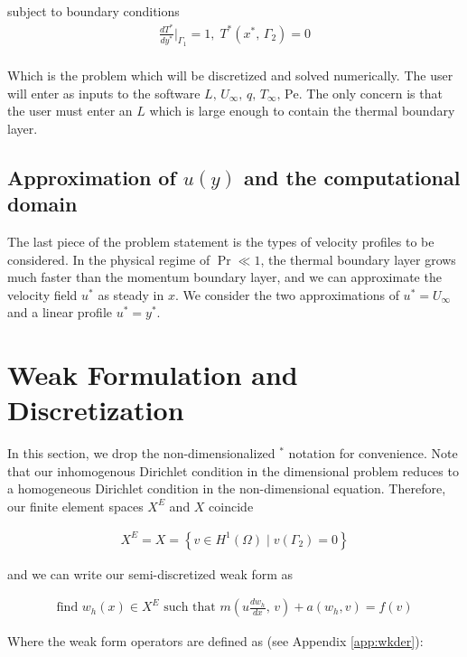 \documentclass[10pt]{article}
\newcommand{\Pe}{\text{Pe}}
\begin{document}
    subject to boundary conditions
    \begin{align}
      \frac{dT^*}{dy^*}\bigg|_{\Gamma_1} = 1,\;
      T^*(x^*,\, \Gamma_2) = 0 \\
    \end{align}

    Which is the problem which will be discretized and solved numerically. The user will enter as
    inputs to the software $L,\, U_\infty,\, q,\, T_\infty,\, \Pe$. The only concern is that the
    user must enter an $L$ which is large enough to contain the thermal boundary layer.
  
    \subsection{Approximation of $u(y)$ and the computational domain}

    The last piece of the problem statement is the types of velocity profiles to be considered. In
    the physical regime of $\Pr \ll 1$, the thermal boundary layer grows much faster than the
    momentum boundary layer, and we can approximate the velocity field $u^*$ as steady in $x$. We
    consider the two approximations of $u^* = U_\infty$ and a linear profile $u^* = y^*$.

\section{Weak Formulation and Discretization}

    In this section, we drop the non-dimensionalized $^*$ notation for convenience. Note that our
    inhomogenous Dirichlet condition in the dimensional problem reduces to a homogeneous Dirichlet
    condition in the non-dimensional equation. Therefore, our finite element spaces $X^E$ and $X$
    coincide

    \begin{align}
      X^E = X =  \left\{ v \in H^1(\Omega) \mid v(\Gamma_2) = 0 \right\}
    \end{align}

    and we can write our semi-discretized weak form as 

    \begin{align}
      \text{find } w_h(x)\in X^E \text{ such that }
      m\left(u\frac{dw_h}{dx},\, v  \right) + a(w_h,v) = f(v)
    \end{align}

    Where the weak form operators are defined as (see Appendix \ref{app:wkder}):
\end{document}
